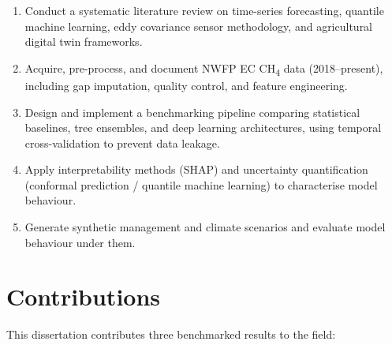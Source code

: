 \begin{enumerate}
    \item Conduct a systematic literature review on time-series forecasting, quantile machine
    learning, eddy covariance sensor methodology, and agricultural digital twin frameworks.
    \item Acquire, pre-process, and document NWFP EC CH\textsubscript{4} data (2018--present),
    including gap imputation, quality control, and feature engineering.
    \item Design and implement a benchmarking pipeline comparing statistical baselines, tree
    ensembles, and deep learning architectures, using temporal cross-validation to prevent data
    leakage.
    \item Apply interpretability methods (SHAP) and uncertainty quantification (conformal
    prediction / quantile machine learning) to characterise model behaviour.
    \item Generate synthetic management and climate scenarios and evaluate model behaviour under
    them.
\end{enumerate}

\section{Contributions}

This dissertation contributes three benchmarked results to the field:

